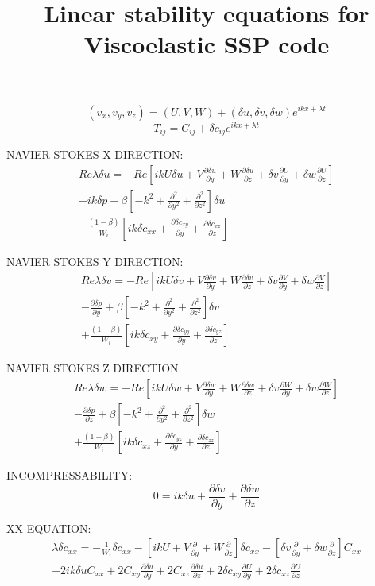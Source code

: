 \documentclass[12,a4paper]{article}
\newcommand{\dy}[1]{\frac{\partial #1}{\partial y}}
\newcommand{\dz}[1]{\frac{\partial #1}{\partial z}}
\newcommand{\scxx}{\delta c_{xx}}
\newcommand{\scyy}{\delta c_{yy}}
\newcommand{\sczz}{\delta c_{zz}}
\newcommand{\scxy}{\delta c_{xy}}
\newcommand{\scxz}{\delta c_{xz}}
\newcommand{\scyz}{\delta c_{yz}}
\newcommand{\su}{\delta u}
\newcommand{\sv}{\delta v}
\newcommand{\sw}{\delta w}
\newcommand{\spr}{\delta p}
\newcommand{\Wi}{\frac{1}{W_{i}}}
\newcommand{\first}[2]{-\Wi \delta c_{#1 #2} - \left[ ikU
+ V\frac{\partial}{\partial y} + W\frac{\partial}{\partial z} \right] \delta c_{#1 #2} 
- \left[ \sv\frac{\partial }{\partial y} + \sw\frac{\partial }{\partial z} \right] C_{#1 #2}}
\newcommand{\laplacian}{\left[-k^{2} + \frac{\partial^{2}}{\partial y^{2}} + \frac{\partial^{2}}{\partial z^{2}}\right]}
\begin{document}
\title{Linear stability equations for Viscoelastic SSP code}
\maketitle

\begin{equation}
 (v_{x}, v_{y}, v_{z}) = (U,V,W) + (\su, \sv, \sw)e^{ikx + \lambda t}
\end{equation}
\begin{equation}
T_{ij} = C_{ij} + \delta c_{ij} e^{ikx + \lambda t}
\end{equation}

NAVIER STOKES X DIRECTION:
\begin{multline}
 Re \lambda \su = -Re \left[ ikU \su + V \dy{\su} + W\dz{\su} + \sv \dy{U} +\sw \dz{U} \right]\\
 - ik\spr + \beta \laplacian \su \\
 + \frac{(1-\beta)}{W_{i}}\left[ ik\scxx + \dy{\scxy} + \dz{\scxz} \right]  
\end{multline}

NAVIER STOKES Y DIRECTION:
\begin{multline}
Re \lambda \sv = -Re \left[ ikU \sv + V \dy{\sv} + W\dz{\sv} + \sv \dy{V} +\sw \dz{V} \right]\\
 - \dy{\spr} + \beta \laplacian \sv \\
 + \frac{(1-\beta)}{W_{i}}\left[ ik \scxy + \dy{\scyy} + \dz{\scyz} \right]
\end{multline}

NAVIER STOKES Z DIRECTION:
\begin{multline}
 Re \lambda \sw = -Re \left[ ikU \sw + V \dy{\sw} + W\dz{\sw} + \sv \dy{W} +\sw \dz{W} \right]\\
 - \dz{\spr} + \beta \laplacian \sw \\
 + \frac{(1-\beta)}{W_{i}}\left[ ik \scxz + \dy{\scyz} + \dz{\sczz} \right]
\end{multline}

INCOMPRESSABILITY:
\begin{equation}
 0 = ik\su + \dy{\sv} + \dz{\sw}
\end{equation}

XX EQUATION:
\begin{multline}
  \lambda \delta c_{xx}  = \first{x}{x} \\
+ 2ik\su C_{xx} + 2C_{xy} \dy{\su} + 2C_{xz} \dz{\su} + 2\scxy \dy{U} + 2\scxz \dz{U}
\end{multline}
\end{document}
